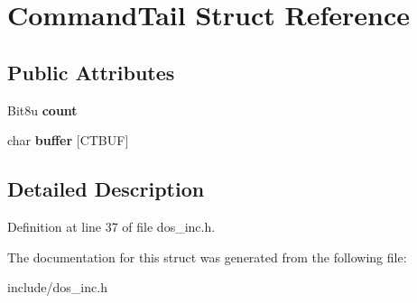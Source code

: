 \hypertarget{structCommandTail}{\section{Command\-Tail Struct Reference}
\label{structCommandTail}
}
\subsection*{Public Attributes}
\begin{DoxyCompactItemize}
\item 
\hypertarget{structCommandTail_a3d3bbe7fd2ae49bcea888d8156ababcd}{Bit8u {\bfseries count}}\label{structCommandTail_a3d3bbe7fd2ae49bcea888d8156ababcd}

\item 
\hypertarget{structCommandTail_ad44cf8eb402645e22f09cbbb998bf6db}{char {\bfseries buffer} \mbox{[}C\-T\-B\-U\-F\mbox{]}}\label{structCommandTail_ad44cf8eb402645e22f09cbbb998bf6db}

\end{DoxyCompactItemize}


\subsection{Detailed Description}


Definition at line 37 of file dos\-\_\-inc.\-h.



The documentation for this struct was generated from the following file\-:\begin{DoxyCompactItemize}
\item 
include/dos\-\_\-inc.\-h\end{DoxyCompactItemize}
